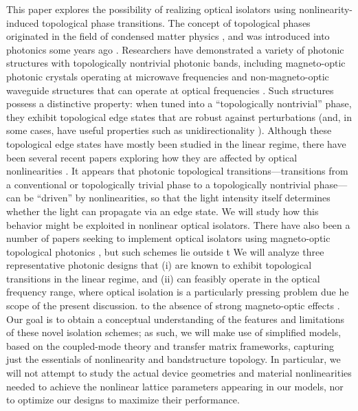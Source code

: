 \documentclass[aps,prx,twocolumn,superscriptaddress]{revtex4-1}
\begin{document}
This paper explores the possibility of realizing optical isolators using nonlinearity-induced topological phase transitions.  The concept of topological phases originated in the field of condensed matter physics \cite{bernevigbook}, and was introduced into photonics some years ago \cite{haldane2008prl,haldane2008pra,wang2008prl,
wang2008nature,hafezi2011nphy,fang2012nphoton,
liang2013,khanikaev2013nmat,rechtsman2013nature,hafezi2014,lu2014nphoton}.  Researchers have demonstrated a variety of photonic structures with topologically nontrivial photonic bands, including magneto-optic photonic crystals operating at microwave frequencies \cite{haldane2008prl,haldane2008pra,wang2008prl,wang2008nature} and non-magneto-optic waveguide structures that can operate at optical frequencies \cite{hafezi2011nphy,rechtsman2013nature,hafezi2014}.  Such structures possess a distinctive property: when tuned into a ``topologically nontrivial'' phase, they exhibit topological edge states that are robust against perturbations (and, in some cases, have useful properties such as unidirectionality \cite{wang2008prl}).  Although these topological edge states have mostly been studied in the linear regime, there have been several recent papers exploring how they are affected by optical nonlinearities \cite{Lumer2013,ablowitz2014,alu2016,daniel2016soliton,li2017ssh}.  It appears that photonic topological transitions---transitions from a conventional or topologically trivial phase to a topologically nontrivial phase---can be ``driven'' by nonlinearities, so that the light intensity itself determines whether the light can propagate via an edge state.  We will study how this behavior might be exploited in nonlinear optical isolators.  There have also been a number of papers seeking to implement optical isolators using magneto-optic topological photonics \cite{el2013apl,el2015ol}, but such schemes lie outside t
We will analyze three representative photonic designs that (i) are known to exhibit topological transitions in the linear regime, and (ii) can feasibly operate in the optical frequency range, where optical isolation is a particularly pressing problem due he scope of the present discussion.
to the absence of strong magneto-optic effects \cite{soljacic_review,el2013apl,el2015ol}.  Our goal is to obtain a conceptual understanding of the features and limitations of these novel isolation schemes; as such, we will make use of simplified models, based on the coupled-mode theory and transfer matrix frameworks, capturing just the essentials of nonlinearity and bandstructure topology.  In particular, we will not attempt to study the actual device geometries and material nonlinearities needed to achieve the nonlinear lattice parameters appearing in our models, nor to optimize our designs to maximize their performance.
\end{document}
